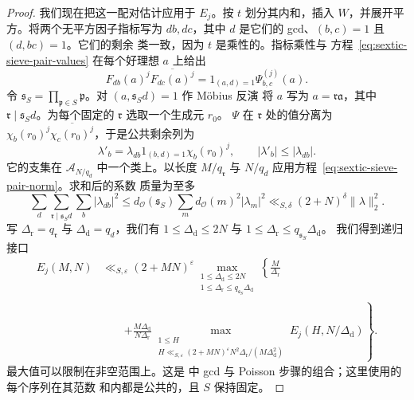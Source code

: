 \begin{proof}
我们现在把这一配对估计应用于 $E_j$。按
$t$ 划分其内和，插入 $W$，并展开平方。将两个无平方因子指标写为
$db,dc$，其中 $d$ 是它们的 gcd、$(b,c)=1$ 且 $(d,bc)=1$。它们的剩余
类一致，因为 $t$ 是乘性的。指标乘性与
方程~\eqref{eq:sextic-sieve-pair-values} 在每个好理想 $a$ 上给出
\[
 F_{db}(a)^j\overline{F_{dc}(a)^j}
   =1_{(a,d)=1}\Psi_{b,c}^{(j)}(a).
\]
令 $\mathfrak s_S=\prod_{\mathfrak p\in S}\mathfrak p$。对 $(a,\mathfrak s_Sd)=1$ 作 M\"obius 反演
将 $a$ 写为 $a=\mathfrak r\mathfrak a$，其中
$\mathfrak r\mid\mathfrak s_Sd$。为每个固定的 $\mathfrak r$ 选取一个生成元 $r_0$。
$\Psi$ 在 $\mathfrak r$ 处的值分离为
$\chi_b(r_0)^j\overline{\chi_c(r_0)^j}$，于是公共剩余列为
\[
 \lambda'_b=\lambda_{db}1_{(b,d)=1}\chi_b(r_0)^j,
 \qquad |\lambda'_b|\le|\lambda_{db}|.
\]
它的支集在 $\mathcal A_{N/q_d}$ 中一个类上。以长度 $M/q_{\mathfrak r}$
与 $N/q_d$ 应用方程~\eqref{eq:sextic-sieve-pair-norm}。求和后的系数
质量为至多
\[
 \sum_d\sum_{\mathfrak r\mid\mathfrak s_Sd}\sum_b|\lambda_{db}|^2
 \le d_{\mathcal O}(\mathfrak s_S)
       \sum_m d_{\mathcal O}(m)^2|\lambda_m|^2
 \ll_{S,\delta}(2+N)^\delta\|\lambda\|_2^2.
\]
写 $\Delta_{\mathrm r}=q_{\mathfrak r}$ 与 $\Delta_{\mathrm d}=q_d$，我们有
$1\le\Delta_{\mathrm d}\le2N$ 与 $1\le\Delta_{\mathrm r}\le q_{\mathfrak s_S}\Delta_{\mathrm d}$。
我们得到递归接口
\begin{equation}\label{eq:sextic-sieve-norm-reflection}
 \begin{split}
 E_j(M,N)
 &\ll_{S,\varepsilon}(2+MN)^\varepsilon
 \max_{\substack{1\le\Delta_{\mathrm d}\le2N\\
                 1\le\Delta_{\mathrm r}\le q_{\mathfrak s_S}\Delta_{\mathrm d}}}
 \left\{\frac M{\Delta_{\mathrm r}}\right.\\
 &\qquad\left.+
 \frac{M\Delta_{\mathrm d}}{N\Delta_{\mathrm r}}
 \max_{\substack{1\le H\\
       H\ll_{S,\varepsilon}(2+MN)^\varepsilon
              N^2\Delta_{\mathrm r}/(M\Delta_{\mathrm d}^2)}}
       E_j(H,N/\Delta_{\mathrm d})\right\}.
 \end{split}
\end{equation}
最大值可以限制在非空范围上。这是 \cite[引理~3.2--3.3]{BGL} 中
gcd 与 Poisson 步骤的组合；这里使用的每个序列在其范数
和内都是公共的，且 $S$ 保持固定。


\end{proof}
